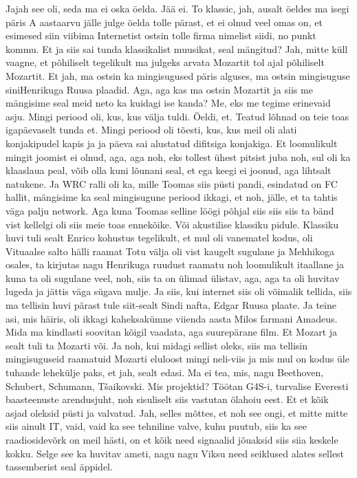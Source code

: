Jajah see oli, seda ma ei oska öelda. Jää ei.
To klassic, jah, ausalt öeldes ma isegi päris A aastaarvu jälle julge öelda tolle pärast, et ei olnud veel omas on, et esimesed siin viibima Internetist ostsin tolle firma nimelist siidi, no punkt kommu. Et ja siis sai tunda klassikalist muusikat, seal mängitud? Jah, mitte küll vaagne, et põhiliselt tegelikult ma julgeks arvata Mozartit tol ajal põhiliselt Mozartit. Et jah, ma ostsin ka mingisugused päris alguses, ma ostsin mingisuguse siniHenrikuga Ruusa plaadid. Aga, aga kas ma ostsin Mozartit ja siis me mängisime seal meid neto ka kuidagi ise kanda? Me, eks me tegime erinevaid asju. Mingi periood oli, kus, kus välja tuldi.
Öeldi, et.
Teatud lõhnad on teie toas igapäevaselt tunda et.
Mingi periood oli tõesti, kus, kus meil oli alati konjakipudel kapis ja ja päeva sai alustatud difitsiga konjakiga. Et loomulikult mingit joomist ei olnud, aga, aga noh, eks tollest ühest pitsist juba noh, sul oli ka klaaslaua peal, võib olla kuni lõunani seal, et ega keegi ei joonud, aga lihtsalt natukene. Ja WRC ralli oli ka, mille Toomas siis püsti pandi, esindatud on FC hallit, mängisime ka seal mingisugune periood ikkagi, et noh, jälle, et ta tahtis väga palju network. Aga kuna Toomas selline löögi põhjal siis siis siis ta bänd vist kellelgi oli siis meie toas ennekõike.
Või akustilise klassiku pidule.
Klassiku huvi tuli sealt Enrico kohustus tegelikult, et mul oli vanematel kodus, oli Vituaalse salto hälli raamat Totu välja oli vist kaugelt sugulane ja Mehhikoga osales, ta kirjutas nagu Henrikuga ruudust raamatu noh loomulikult itaallane ja kuna ta oli sugulane veel, noh, siis ta on ülimad ülistav, aga, aga ta oli huvitav lugeda ja jättis väga sügava mulje. Ja siis, kui internet siis oli võimalik tellida, siis ma tellisin huvi pärast tule siit-sealt Sindi nafta, Edgar Ruusa plaate. Ja teine asi, mis häiris, oli ikkagi kaheksakümne viienda aasta Milos farmani Amadeus. Mida ma kindlasti soovitan kõigil vaadata, aga suurepärane film. Et Mozart ja sealt tuli ta Mozarti või. Ja noh, kui midagi sellist oleks, siis ma tellisin mingisuguseid raamatuid Mozarti eluloost mingi neli-viis ja mis mul on kodus üle tuhande lehekülje paks, et jah, sealt edasi. Ma ei tea, mis, nagu Beethoven, Schubert, Schumann, Tšaikovski. Mis projektid?
Töötan G4S-i, turvalise Everesti baasteenuste arendusjuht, noh sisuliselt siis vastutan õlahoiu eest. Et et kõik asjad oleksid püsti ja valvatud. Jah, selles mõttes, et noh see ongi, et mitte mitte siis ainult IT, vaid, vaid ka see tehniline valve, kuhu puutub, siis ka see raadiosidevõrk on meil hästi, on et kõik need signaalid jõuaksid siis siia keskele kokku.
Selge see ka huvitav ameti, nagu nagu Viksu need seiklused alates sellest tassemberist seal äppidel.
